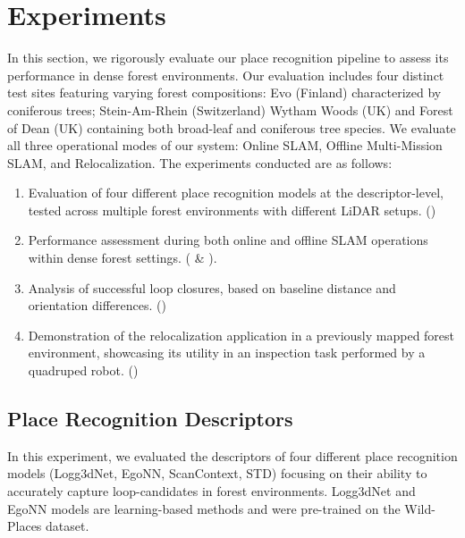 \chapter{Experiments}
\label{chapter:experiments} 


In this section, we rigorously evaluate our place recognition pipeline to assess its performance in dense forest environments. Our evaluation includes four distinct test sites featuring varying forest compositions: Evo (Finland) characterized by coniferous trees; Stein-Am-Rhein (Switzerland) Wytham Woods (UK) and Forest of Dean (UK) containing both broad-leaf and coniferous tree species. We evaluate all three operational modes of our system: Online SLAM, Offline Multi-Mission SLAM, and Relocalization.
The experiments conducted are as follows:
\begin{enumerate}[label=\Roman*.]
  \item Evaluation of four different place recognition models at the descriptor-level, tested across multiple forest environments with different LiDAR setups. () 
  \item Performance assessment during both online and offline SLAM operations within dense forest settings. ( \& ).
  \item Analysis of successful loop closures, based on baseline distance and orientation differences. ()
  \item Demonstration of the relocalization application in a previously mapped forest environment, showcasing its utility in an inspection task performed by a quadruped robot. ()
\end{enumerate}



\section{Place Recognition Descriptors}
\label{sec:exp_desc_analysis} 
In this experiment, we evaluated the descriptors of four different place recognition models (Logg3dNet, EgoNN, ScanContext, STD) focusing on their ability to accurately capture loop-candidates in forest environments. Logg3dNet and EgoNN models are learning-based methods and were pre-trained on the Wild-Places dataset. 
